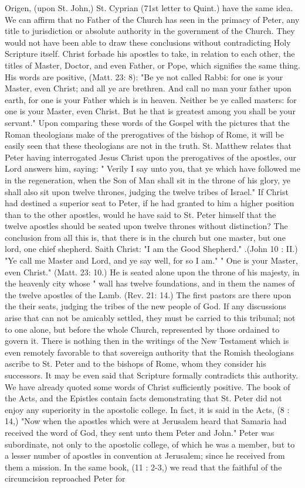 Origen, (upon St. John,) St. Cyprian (71st letter to Quint.) have the same idea. We can affirm that no Father of the Church has seen in the primacy of Peter, any title to jurisdiction or absolute authority in the government of the Church. They would not have been able to draw these conclusions without contradicting Holy Scripture itself. Christ forbade his apostles to take, in relation to each other, the titles of Master, Doctor, and even Father, or Pope, which signifies the same thing. His words are positive, (Matt. 23: 8): "Be ye not called Rabbi: for one is your Master, even Christ; and all ye are brethren. And call no man your father upon earth, for one is your Father which is in heaven. Neither be ye called masters: for one is your Master, even Christ. But he that is greatest among you shall be your servant." Upon comparing these words of the Gospel with the pictures that the Roman theologians make of the prerogatives of the bishop of Rome, it will be easily seen that these theologians are not in the truth. St. Matthew relates that Peter having interrogated Jesus Christ upon the prerogatives of the apostles, our Lord answers him, saying: " Verily I say unto you, that ye which have followed me in the regeneration, when the Son of Man shall sit in the throne of his glory, ye shall also sit upon twelve thrones, judging the twelve tribes of Israel." If Christ had destined a superior seat to Peter, if he had granted to him a higher position than to the other apostles, would he have said to St. Peter himself that the twelve apostles should be seated upon twelve thrones without distinction? The conclusion from all this is, that there is in the church but one master, but one lord, one chief shepherd. Saith Christ: "I am the Good Shepherd." .(John 10 : II.) "Ye call me Master and Lord, and ye say well, for so I am." " One is your Master, even Christ." (Matt. 23: 10.) He is seated alone upon the throne of his majesty, in the heavenly city whose " wall has twelve foundations, and in them the names of the twelve apostles of the Lamb. (Rev. 21: 14.) The first pastors are there upon the their seats, judging the tribes of the new people of God. If any discussions arise that can not be amicably settled, they must be carried to this tribunal; not to one alone, but before the whole Church, represented by those ordained to govern it. There is nothing then in the writings of the New Testament which is even remotely favorable to that sovereign authority that the Romish theologians ascribe to St. Peter and to the bishops of Rome, whom they consider his successors. It may be even said that Scripture formally contradicts this authority. We have already quoted some words of Christ sufficiently positive. The book of the Acts, and the Epistles contain facts demonstrating that St. Peter did not enjoy any superiority in the apostolic college. In fact, it is said in the Acts, (8 : 14,) "Now when the apostles which were at Jerusalem heard that Samaria had received the word of God, they sent unto them Peter and John." Peter was subordinate, not only to the apostolic college, of which he was a member, but to a lesser number of apostles in convention at Jerusalem; since he received from them a mission. In the same book, (11 : 2-3,) we read that the faithful of the circumcision reproached Peter for 